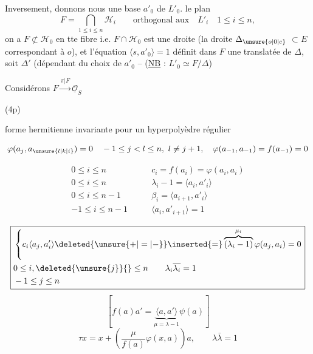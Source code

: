 Inversement, donnons nous une base $a'_0$ de $L'_0$.  le plan
\[
F=\bigcap_{1\leq i\leq n}\mathcal H_i\qquad
\text{orthogonal aux}\quad L'_i\quad 1\leq i\leq n,
\]
 on a  $F\not\subset\mathcal H_0$ en tte fibre i.e. $F\cap\mathcal H_0$ est une droite (la droite $\Delta_{\unsure{o|0|c}}$  $\subset E$ correspondant à $o$), et l'équation \deleted{$\unsure{\xi}$} $\langle s,a'_0\rangle=1$ définit dans $F$ une    translatée de $\Delta$, soit $\Delta'$ (dépendant du choix de $a'_0$ --  (\uline{NB} : $L'_0\simeq F/\Delta$)

Considérons $F\xrightarrow{\pi|F}\underline{\mathcal O}_S$

(4p)

forme hermitienne invariante pour un hyperpolyèdre régulier

\[
\varphi(a_j,a_{\unsure{l|k|i}})=0\quad -1\leq j<l\leq n,\ l\ne j+1,\quad
\varphi(a_{-1},a_{-1})=f(a_{-1})=0
\]

\[
\begin{aligned}
0\leq i\leq n\qquad &c_i=f(a_i)=\varphi(a_i,a_i)\\
0\leq i\leq n\qquad &\lambda_i-1=\langle a_i,a'_i\rangle\\
0\leq i\leq n-1\qquad &\beta_i=\langle a_{i+1},a'_i\rangle\\
-1\leq i\leq n-1\qquad &\langle a_i,a'_{i+1}\rangle=1
\end{aligned}
\]

\[
\boxed{\begin{aligned}
&\left\{c_i\langle a_j,a'_i\rangle\deleted{\unsure{+|=|-}}\inserted{=}\overbrace{(\lambda_i-1)}^{\mu_i}\varphi(a_j,a_i)=0\right.\\
&0\leq i,\deleted{\unsure{j}}{}\leq n\qquad\lambda_i\overline{\lambda_i}=1\\
&-1\leq j\leq n
\end{aligned}}
\]
\[
\left[f(a)a'=\underbrace{\langle a,a'\rangle}_{\mu=\lambda-1}\psi(a)\right]
\]
\[
\tau x=x+\left(\frac{\mu}{f(a)}\varphi(x,a)\right)a,\qquad \lambda\bar\lambda=1
\]


